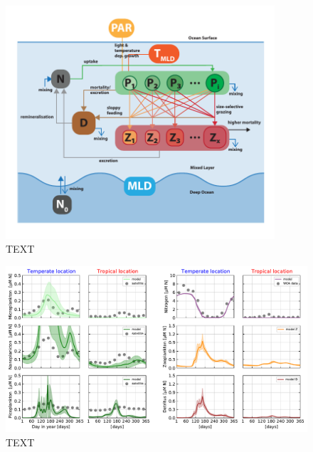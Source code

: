 \documentclass[journal abbreviation, manuscript]{copernicus}
\begin{document}
\begin{figure}[t]
\includegraphics[width=10cm]{Figures/firstdraft_schematics/03__schematics_SizeStructSlab.pdf}
\caption{TEXT}
\label{phydraschematics_3}
\end{figure}



\begin{figure}[t]
\includegraphics[width=12cm]{Figures/firstdraft_plots/04_sizestruct_slab.pdf}
\caption{TEXT}
\label{ASTroCAT_plot}
\end{figure}




\end{document}
